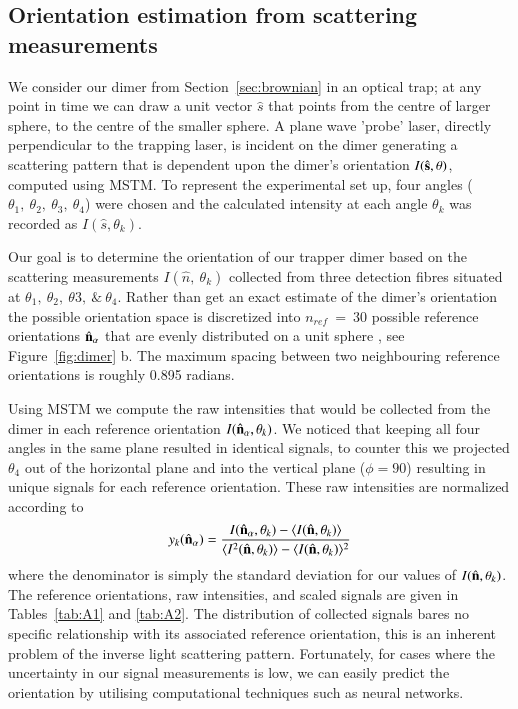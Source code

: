 \documentclass[final,  3p]{elsarticle}
\begin{document}
\subsection{Orientation estimation from scattering measurements}
\label{sec:Bayes}

We consider our dimer from Section~\ref{sec:brownian} in an optical trap; at any point in time we can draw a unit vector $\hat{s}$ that points from the centre of larger sphere, to the centre of the smaller sphere. A plane wave 'probe' laser, directly perpendicular to the trapping laser, is incident on the dimer generating a scattering pattern that is dependent upon the dimer's orientation $I(\hat{\bf s}, \theta)$, computed using MSTM. To represent the experimental set up, four angles  ($\theta_1, \ \theta_2, \ \theta_3, \ \theta_4$) were chosen and the calculated intensity at each angle $\theta_k$ was recorded as $I(\hat{s}, \theta_k)$. 

Our goal is to determine the orientation of our trapper dimer based on the scattering measurements $I(\hat{n}, \ \theta_k)$ collected from three detection fibres situated at $\theta_1,\ \theta_2, \ \theta3, \ \& \ \theta_4$. Rather than get an exact estimate of the dimer's orientation the possible orientation space is discretized into $\textit{n}_{ref} \ = \ 30$ possible reference orientations $\hat{\bf n}_{\alpha}$ that are evenly distributed on a unit sphere \cite{Rey2006}, see Figure~\ref{fig:dimer} b. The maximum spacing between two neighbouring reference orientations is roughly 0.895 radians. 

Using MSTM we compute the raw intensities that would be collected from the dimer in each reference orientation $I(\hat{\bf n}_{\alpha}, \theta_k)$. We noticed that keeping all four angles in the same plane resulted in identical signals, to counter this we projected $\theta_4$ out of the horizontal plane and into the vertical plane ($\phi = 90$) resulting in unique signals for each reference orientation. 
%
These raw intensities are normalized according to
\begin{align}
\label{eq:scale}
  y_k(\hat{\bf n}_\alpha)
  = 
  \frac{I(\hat{\bf n}_\alpha, \theta_k) - \langle I(\hat{\bf n},\theta_k) \rangle } 
  {\langle I^2(\hat{\bf n},\theta_k) \rangle -\langle I(\hat{\bf n}, \theta_k)\rangle^2}
\end{align}
where the denominator is simply the standard deviation for our values of $I(\hat{\bf n}, \theta_k)$. The reference orientations, raw intensities, and scaled signals are given in Tables~\ref{tab:A1} and \ref{tab:A2}. The distribution of collected signals bares no specific relationship with its associated reference orientation, this is an inherent problem of the inverse light scattering pattern. Fortunately, for cases where the uncertainty in our signal measurements is low, we can easily predict the orientation by utilising computational techniques such as neural networks. 
\end{document}

